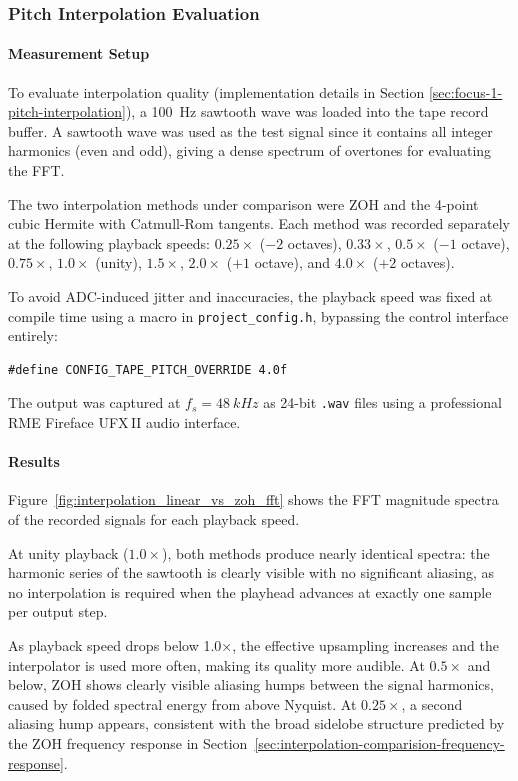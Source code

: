 \subsubsection{Pitch Interpolation Evaluation}
\paragraph{Measurement Setup}

To evaluate interpolation quality (implementation details in Section \ref{sec:focus-1-pitch-interpolation}), a \qty{100}{Hz} sawtooth wave was loaded into the tape record buffer. 
A sawtooth wave was used as the test signal since it contains all integer harmonics (even and odd), giving a dense spectrum of overtones for evaluating the FFT. \cite[p.~665]{georgearfkenMathematicalMethodsPhysicists1985}

The two interpolation methods under comparison were ZOH and the 4-point cubic Hermite 
with Catmull-Rom tangents. Each method was recorded separately at the following playback 
speeds: $0.25\times$ ($-2$ octaves), $0.33\times$, $0.5\times$ ($-1$ octave), 
$0.75\times$, $1.0\times$ (unity), $1.5\times$, $2.0\times$ ($+1$ octave), and 
$4.0\times$ ($+2$ octaves).

To avoid ADC-induced jitter and inaccuracies, the playback speed was fixed at compile time using a macro in \texttt{project\_config.h}, bypassing the control interface entirely:

\begin{verbatim}
#define CONFIG_TAPE_PITCH_OVERRIDE 4.0f
\end{verbatim}

The output was captured at $f_s = \qty{48}{kHz}$ as 24-bit \texttt{.wav} files 
using a professional RME Fireface UFX\,II audio interface.

\paragraph{Results}

Figure~\ref{fig:interpolation_linear_vs_zoh_fft} shows the FFT magnitude spectra of 
the recorded signals for each playback speed. 

At unity playback ($1.0\times$), both methods produce nearly identical spectra: the 
harmonic series of the sawtooth is clearly visible with no significant aliasing, as no 
interpolation is required when the playhead advances at exactly one sample per output step.

As playback speed drops below 1.0×, the effective upsampling increases and the interpolator is used more often, making its quality more audible. 
At $0.5\times$ and below, ZOH shows clearly visible aliasing humps between the 
signal harmonics, caused by folded spectral energy from above Nyquist. At $0.25\times$, a second 
aliasing hump appears, consistent with the broad sidelobe structure predicted by the ZOH 
frequency response in Section~\ref{sec:interpolation-comparision-frequency-response}.

